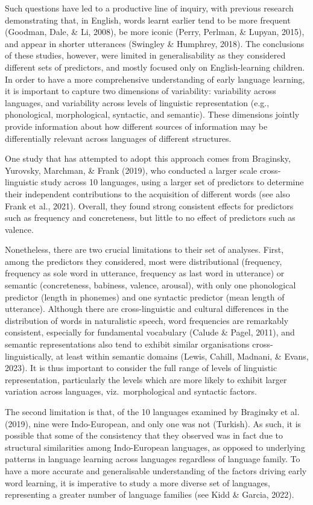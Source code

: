 \documentclass[10pt, letterpaper]{article}
\begin{document}
Such questions have led to a productive line of inquiry, with previous
research demonstrating that, in English, words learnt earlier tend to be
more frequent (Goodman, Dale, \& Li, 2008), be more iconic (Perry,
Perlman, \& Lupyan, 2015), and appear in shorter utterances (Swingley \&
Humphrey, 2018). The conclusions of these studies, however, were limited
in generalisability as they considered different sets of predictors, and
mostly focused only on English-learning children. In order to have a
more comprehensive understanding of early language learning, it is
important to capture two dimensions of variability: variability across
languages, and variability across levels of linguistic representation
(e.g., phonological, morphological, syntactic, and semantic). These
dimensions jointly provide information about how different sources of
information may be differentially relevant across languages of different
structures.

One study that has attempted to adopt this approach comes from
Braginsky, Yurovsky, Marchman, \& Frank (2019), who conducted a larger
scale cross-linguistic study across 10 languages, using a larger set of
predictors to determine their independent contributions to the
acquisition of different words (see also Frank et al., 2021). Overall,
they found strong consistent effects for predictors such as frequency
and concreteness, but little to no effect of predictors such as valence.

Nonetheless, there are two crucial limitations to their set of analyses.
First, among the predictors they considered, most were distributional
(frequency, frequency as sole word in utterance, frequency as last word
in utterance) or semantic (concreteness, babiness, valence, arousal),
with only one phonological predictor (length in phonemes) and one
syntactic predictor (mean length of utterance). Although there are
cross-linguistic and cultural differences in the distribution of words
in naturalistic speech, word frequencies are remarkably consistent,
especially for fundamental vocabulary (Calude \& Pagel, 2011), and
semantic representations also tend to exhibit similar organisations
cross-linguistically, at least within semantic domains (Lewis, Cahill,
Madnani, \& Evans, 2023). It is thus important to consider the full
range of levels of linguistic representation, particularly the levels
which are more likely to exhibit larger variation across languages,
viz.~morphological and syntactic factors.

The second limitation is that, of the 10 languages examined by Braginsky
et al. (2019), nine were Indo-European, and only one was not (Turkish).
As such, it is possible that some of the consistency that they observed
was in fact due to structural similarities among Indo-European
languages, as opposed to underlying patterns in language learning across
languages regardless of language family. To have a more accurate and
generalisable understanding of the factors driving early word learning,
it is imperative to study a more diverse set of languages, representing
a greater number of language families (see Kidd \& Garcia, 2022).
\end{document}

